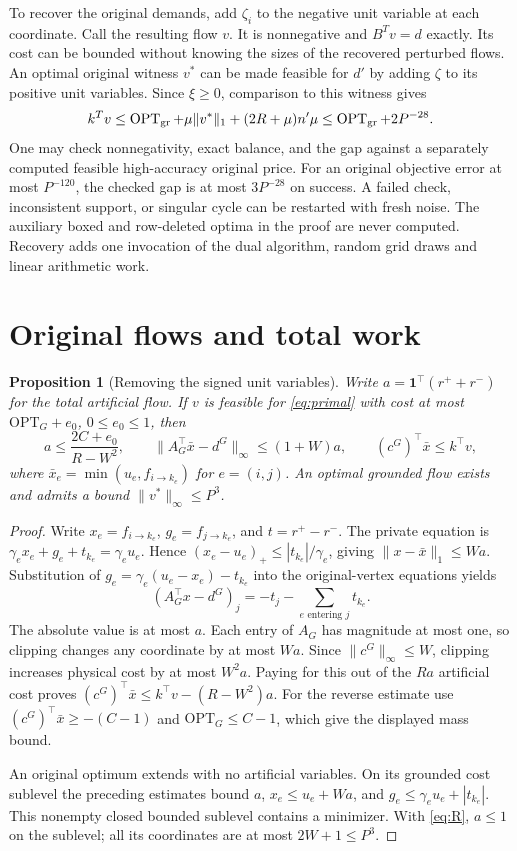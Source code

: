 \documentclass[11pt,letterpaper]{article}
\newtheorem{proposition}[theorem]{Proposition}
\begin{document}
To recover the original demands, add \(\zeta_i\) to the negative unit
variable at each coordinate. Call the resulting flow \(v\). It is
nonnegative and \(B^Tv=d\) exactly. Its cost can be bounded without
knowing the sizes of the recovered perturbed flows. An optimal original
witness \(v^*\) can be made feasible for \(d'\) by adding \(\zeta\) to
its positive unit variables. Since \(\xi\ge0\), comparison to this
witness gives
\[
 k^Tv\le \operatorname{OPT}_{\rm gr}
        +\mu\|v^*\|_1+(2R+\mu)n'\mu
 \le \operatorname{OPT}_{\rm gr}+2P^{-28}.
\]
One may check nonnegativity, exact balance, and the gap against a separately
computed feasible high-accuracy original price. For an original objective
error at most \(P^{-120}\), the checked gap is at most \(3P^{-28}\) on
success. A failed check, inconsistent support, or singular cycle can be
restarted with fresh noise. The auxiliary boxed and row-deleted optima in
the proof are never computed. Recovery adds one invocation of the dual
algorithm, random grid draws and linear arithmetic work.
\section{Original flows and total work}\label{sec:finish}
\begin{proposition}[Removing the signed unit variables]\label{prop:transfer}
Write $a=\mathbf1^\top(r^++r^-)$ for the total artificial flow. If $v$ is
feasible for \eqref{eq:primal} with cost at most $\mathrm{OPT}_G+e_0$,
$0\le e_0\le1$, then
\[
 a\le\frac{2C+e_0}{R-W^2},\qquad
 \|A_G^\top\bar x-d^G\|_\infty\le(1+W)a,\qquad
 (c^G)^\top\bar x\le k^\top v,
\]
where $\bar x_e=\min(u_e,f_{i\to k_e})$ for $e=(i,j)$.
An optimal grounded flow exists and admits a bound $\|v^*\|_\infty\le P^3$.
\end{proposition}
\begin{proof}
Write $x_e=f_{i\to k_e}$, $g_e=f_{j\to k_e}$, and $t=r^+-r^-$.
The private equation is $\gamma_e x_e+g_e+t_{k_e}=\gamma_e u_e$.
Hence $(x_e-u_e)_+\le |t_{k_e}|/\gamma_e$, giving
$\|x-\bar x\|_1\le Wa$. Substitution of
$g_e=\gamma_e(u_e-x_e)-t_{k_e}$ into the original-vertex equations yields
\[
 (A_G^\top x-d^G)_j=-t_j-\sum_{e\text{ entering }j}t_{k_e}.
\]
The absolute value is at most $a$. Each entry of $A_G$ has magnitude
at most one, so clipping changes any coordinate by at most $Wa$.
Since $\|c^G\|_\infty\le W$, clipping increases physical cost by at
most $W^2a$. Paying for this out of the $Ra$ artificial cost proves
$(c^G)^\top\bar x\le k^\top v-(R-W^2)a$.
For the reverse estimate use $(c^G)^\top\bar x\ge -(C-1)$ and
$\mathrm{OPT}_G\le C-1$, which give the displayed mass bound.

An original optimum extends with no artificial variables. On its grounded
cost sublevel the preceding estimates bound $a$, $x_e\le u_e+Wa$, and
$g_e\le\gamma_e u_e+|t_{k_e}|$. This nonempty closed bounded sublevel
contains a minimizer. With \eqref{eq:R}, $a\le1$ on the sublevel;
all its coordinates are at most $2W+1\le P^3$.
\end{proof}
\end{document}
